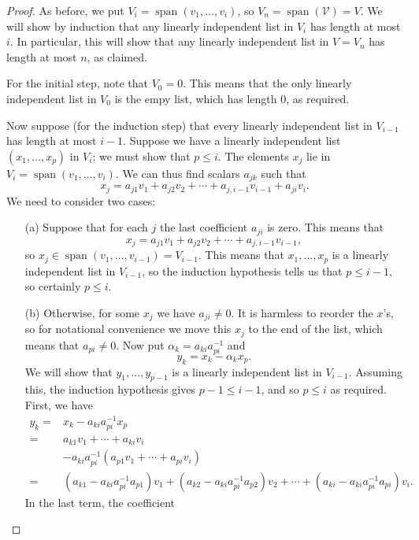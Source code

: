 \documentclass{amsart}
\newcommand{\spn}       {\operatorname{span}}
\newcommand{\al}        {\alpha}
\newcommand{\CV}        {{\mathcal{V}}}
\renewcommand{\:}       {\colon}
\theoremstyle{definition}
\begin{document}
\begin{proof}
 As before, we put $V_i=\spn(v_1,\dotsc,v_i)$, so
 $V_n=\spn(\CV)=V$.  We will show by induction that any
 linearly independent list in $V_i$ has length at most $i$.
 In particular, this will show that any linearly independent
 list in $V=V_n$ has length at most $n$, as claimed.

 For the initial step, note that $V_0=0$.  This means that
 the only linearly independent list in $V_0$ is the empy
 list, which has length $0$, as required.

 Now suppose (for the induction step) that every linearly
 independent list in $V_{i-1}$ has length at most $i-1$.
 Suppose we have a linearly independent list
 $(x_1,\dotsc,x_p)$ in $V_i$; we must show that $p\leq i$.  
 The elements $x_j$ lie in $V_i=\spn(v_1,\dotsc,v_i)$.  We
 can thus find scalars $a_{jk}$ such that
 \[ x_j = a_{j1}v_1 + a_{j2}v_2 + \dotsb +
          a_{j,i-1}v_{i-1} + a_{ji}v_i.
 \]
 We need to consider two cases:
 \begin{itemize}
  \item[(a)] Suppose that for each $j$ the last coefficient
   $a_{ji}$ is zero.  This means that
   \[ x_j = a_{j1}v_1 + a_{j2}v_2 + \dotsb + a_{j,i-1}v_{i-1},
   \]
   so $x_j\in\spn(v_1,\dotsc,v_{i-1})=V_{i-1}$.  This means
   that $x_1,\dotsc,x_p$ is a linearly independent list in
   $V_{i-1}$, so the induction hypothesis tells us that
   $p\leq i-1$, so certainly $p\leq i$.
  \item[(b)] Otherwise, for some $x_j$ we have
   $a_{ji}\neq 0$.  It is harmless to reorder the $x$'s, so
   for notational convenience we move this $x_j$ to the end
   of the list, which means that $a_{pi}\neq 0$.  Now put 
   $\al_k=a_{ki}a_{pi}^{-1}$ and 
   \[ y_k = x_k - \al_k x_p. \]
   We will show that $y_1,\dotsc,y_{p-1}$ is a linearly
   independent list in $V_{i-1}$.  Assuming this, the
   induction hypothesis gives $p-1\leq i-1$, and so
   $p\leq i$ as required.  First, we have 
   \begin{align*}
    y_k =& x_k - a_{ki}a_{pi}^{-1} x_p \\
        =& a_{k1}v_1 + \dotsb + a_{ki}v_i \\
         & - a_{ki}a_{pi}^{-1}( a_{p1}v_1 + \dotsb + a_{pi}v_i  ) \\
        =& (a_{k1}-a_{ki}a_{pi}^{-1}a_{p1}) v_1 + 
           (a_{k2}-a_{ki}a_{pi}^{-1}a_{p2}) v_2 + \dotsb + 
           (a_{ki}-a_{ki}a_{pi}^{-1}a_{pi}) v_i.
   \end{align*}
   In the last term, the coefficient

\end{itemize}
\end{proof}
\end{document}
